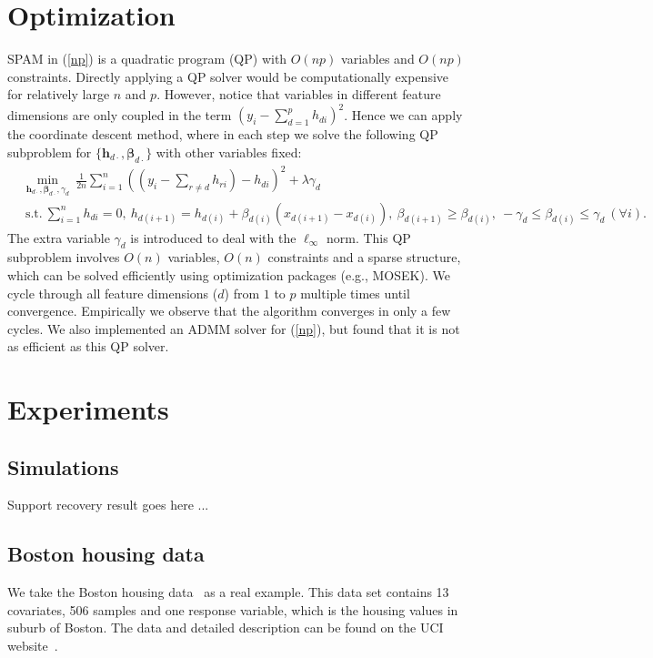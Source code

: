 \documentclass{article} %
\newcommand{\bds}[1]{\boldsymbol{#1}}
\begin{document}
\section{Optimization}
SPAM in (\ref{np}) is a quadratic program (QP) with $O(np)$ variables and $O(np)$ constraints. 
Directly applying a QP solver would be computationally expensive for relatively large $n$ and $p$. However, notice that variables
in different feature dimensions are only coupled in the term $(y_{i}-\sum_{d=1}^{p}h_{di})^{2}$. Hence we can apply the coordinate descent method,
where in each step we solve the following QP subproblem for $\{\bds{h}_{d\cdot},\bds{\beta}_{d\cdot}\}$ with other variables fixed:
\begin{equation}\begin{split}\nonumber
       &\min_{\bds{h}_{d\cdot},\bds{\beta}_{d\cdot},\gamma_{d}} \ \frac{1}{2n}\sum_{i=1}^{n}((y_{i}-\sum_{r\neq{d}}h_{ri})-h_{di})^{2} + \lambda\gamma_{d} \\
        &\ \textrm{s.t.} \ \sum_{i=1}^{n}h_{di}=0, \ h_{d(i+1)} = h_{d(i)} + \beta_{d(i)}(x_{d(i+1)}-x_{d(i)}), \ \beta_{d(i+1)} \geq \beta_{d(i)}, \ -\gamma_{d}\leq\beta_{d(i)}\leq\gamma_{d} \ (\forall i).
\end{split}\end{equation}
The extra variable $\gamma_{d}$ is introduced to deal with the $\ell_{\infty}$ norm. This QP subproblem involves $O(n)$ variables, $O(n)$ constraints and a sparse structure, 
which can be solved efficiently using optimization packages (e.g., MOSEK).  We cycle through all feature dimensions ($d$) from $1$ to $p$ multiple times until convergence.
Empirically we observe that the algorithm converges in only a few cycles. We also implemented an ADMM solver for (\ref{np}), but found that it is not as efficient as this QP solver.

\newpage
\section{Experiments}
\subsection{Simulations}
Support recovery result goes here ...

\subsection{Boston housing data}
We take the Boston housing data~\cite{?} as a real example. This data set
contains 13 covariates, 506 samples and one response variable, which is
the housing values in suburb of Boston. The data and detailed description
can be found on the UCI website~\cite{?}. 
\end{document}
